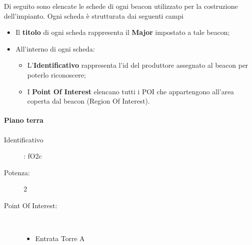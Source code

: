 \documentclass[../SperimentazioniPratiche.tex]{subfiles}
\begin{document}
		
		Di seguito sono elencate le schede di ogni beacon utilizzato per la costruzione dell'impianto. Ogni scheda è strutturata dai seguenti campi
		\begin{itemize}
			\item Il \textbf{titolo} di ogni scheda rappresenta il \textbf{Major} impostato a tale beacon;
			\item All'interno di ogni scheda:
			\begin{itemize}
				\item L'\textbf{Identificativo} rappresenta l'id del produttore assegnato al beacon per poterlo riconoscere;
				\item I \textbf{Point Of Interest} elencano tutti i POI che appartengono all'area coperta dal beacon (Region Of Interest).
			\end{itemize}
		\end{itemize}
		
		\newpage
		\paragraph{Piano terra}		
		
			\paragraph*{}
			\label{00000}
			\begin{tcolorbox}[fonttitle=\bfseries, 
								adjusted title={\Large Beacon 00000},
								sharp corners=south,
								colback=white, 
								colframe=white!50!blue!75!black]
								
				\begin{description}%
					\item[Identificativo]: fO2c
					\item[Potenza:] 2

					\tcbline					
					
					\item[Point Of Interest:] \ \par
					\begin{itemize}
						\item Entrata Torre A
					\end{itemize}					   				
				\end{description}  				
			\end{tcolorbox}
			
\end{document}
